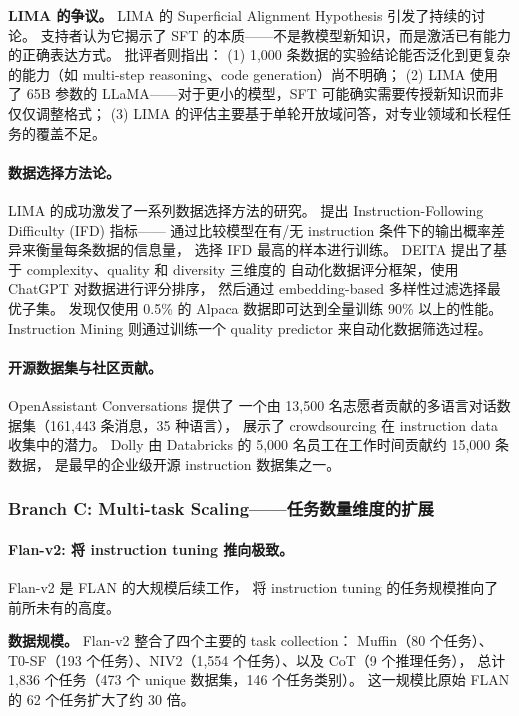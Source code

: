 \textbf{LIMA 的争议。}
LIMA 的 Superficial Alignment Hypothesis 引发了持续的讨论。
支持者认为它揭示了 SFT 的本质——不是教模型新知识，而是激活已有能力的正确表达方式。
批评者则指出：
(1) 1,000 条数据的实验结论能否泛化到更复杂的能力（如 multi-step reasoning、code generation）尚不明确；
(2) LIMA 使用了 65B 参数的 LLaMA——对于更小的模型，SFT 可能确实需要传授新知识而非仅仅调整格式；
(3) LIMA 的评估主要基于单轮开放域问答，对专业领域和长程任务的覆盖不足。

\paragraph{数据选择方法论。}
LIMA 的成功激发了一系列数据选择方法的研究。
\citet{li2023ifd} 提出 Instruction-Following Difficulty (IFD) 指标——
通过比较模型在有/无 instruction 条件下的输出概率差异来衡量每条数据的信息量，
选择 IFD 最高的样本进行训练。
DEITA \citep{liu2024deita} 提出了基于 complexity、quality 和 diversity 三维度的
自动化数据评分框架，使用 ChatGPT 对数据进行评分排序，
然后通过 embedding-based 多样性过滤选择最优子集。
\citet{chen2023maybeonly} 发现仅使用 0.5\% 的 Alpaca 数据即可达到全量训练 90\% 以上的性能。
Instruction Mining \citep{cao2023instructionmining} 则通过训练一个 quality predictor
来自动化数据筛选过程。

\paragraph{开源数据集与社区贡献。}
OpenAssistant Conversations \citep{kopf2023openassistant} 提供了
一个由 13,500 名志愿者贡献的多语言对话数据集（161,443 条消息，35 种语言），
展示了 crowdsourcing 在 instruction data 收集中的潜力。
Dolly \citep{conover2023dolly} 由 Databricks 的 5,000 名员工在工作时间贡献约 15,000 条数据，
是最早的企业级开源 instruction 数据集之一。


\subsubsection{Branch C: Multi-task Scaling——任务数量维度的扩展}
\label{sec:t1-multitask}

\paragraph{Flan-v2: 将 instruction tuning 推向极致。}
Flan-v2 是 FLAN 的大规模后续工作，
将 instruction tuning 的任务规模推向了前所未有的高度。

\textbf{数据规模。}
Flan-v2 整合了四个主要的 task collection：
Muffin（80 个任务）、T0-SF（193 个任务）、NIV2（1,554 个任务）、以及 CoT（9 个推理任务），
总计 1,836 个任务（473 个 unique 数据集，146 个任务类别）。
这一规模比原始 FLAN 的 62 个任务扩大了约 30 倍。

